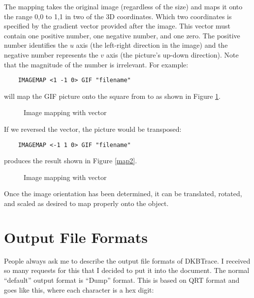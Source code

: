 The mapping takes the original image (regardless of the size) and maps
it onto the range 0,0 to 1,1 in two of the 3D coordinates.  Which two
coordinates is specified by the gradient
vector provided after the
image.  This vector must contain one positive number, one negative
number, and one zero.  The positive number identifies the $u$ axis
(the left-right direction in the image) and the negative number
represents the $v$ axis (the picture's up-down direction).  Note that
the magnitude of the number is irrelevant. For example:
\begin{verbatim}
    IMAGEMAP <1 -1 0> GIF "filename"
\end{verbatim}
will map the GIF picture onto the square from {\tt <0 0 0>} to
{\tt <1 1 0>} as shown in Figure \ref{map1}.
\begin{figure}[htbp]
\begin{centering}

\caption{Image mapping with vector {\tt <1 -1 0>}}
\label{map1}
\end{centering}
\end{figure}
If we reversed the vector, the picture would be transposed:
\begin{verbatim}
    IMAGEMAP <-1 1 0> GIF "filename"
\end{verbatim}
produces the result shown in Figure \ref{map2}.
\begin{figure}[htbp]
\begin{centering}

\caption{Image mapping with vector {\tt <-1 1 0>}}
\label{square-map2}
\end{centering}
\end{figure}
Once the image orientation has been determined, it can be translated, rotated,
and scaled as desired to map properly onto the object.

\section{Output File Formats}

People always ask me to describe the output file formats of DKBTrace.  I
received so many requests for this that I decided to put it into the document.
The normal ``default'' output format is ``Dump''
format.  This is based on QRT format and goes like this, where each
character is a hex digit:

